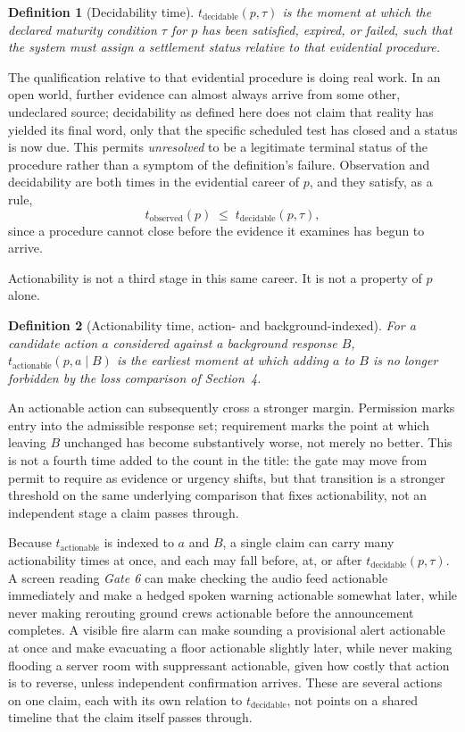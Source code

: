 \documentclass[11pt]{article}
\newtheorem{definition}{Definition}
\begin{document}
\begin{definition}[Decidability time]
$t_{\mathrm{decidable}}(p, \tau)$ is the moment at which the declared maturity condition $\tau$ for $p$ has been satisfied, expired, or failed, such that the system must assign a settlement status relative to that evidential procedure.
\end{definition}

The qualification relative to that evidential procedure is doing real work. In an open world, further evidence can almost always arrive from some other, undeclared source; decidability as defined here does not claim that reality has yielded its final word, only that the specific scheduled test has closed and a status is now due. This permits \emph{unresolved} to be a legitimate terminal status of the procedure rather than a symptom of the definition's failure. Observation and decidability are both times in the evidential career of $p$, and they satisfy, as a rule,
\[
t_{\mathrm{observed}}(p) \;\leq\; t_{\mathrm{decidable}}(p, \tau),
\]
since a procedure cannot close before the evidence it examines has begun to arrive.

Actionability is not a third stage in this same career. It is not a property of $p$ alone.

\begin{definition}[Actionability time, action- and background-indexed]
For a candidate action $a$ considered against a background response $B$, $t_{\mathrm{actionable}}(p, a \mid B)$ is the earliest moment at which adding $a$ to $B$ is no longer forbidden by the loss comparison of Section~4.
\end{definition}

An actionable action can subsequently cross a stronger margin. Permission marks entry into the admissible response set; requirement marks the point at which leaving $B$ unchanged has become substantively worse, not merely no better. This is not a fourth time added to the count in the title: the gate may move from permit to require as evidence or urgency shifts, but that transition is a stronger threshold on the same underlying comparison that fixes actionability, not an independent stage a claim passes through.

Because $t_{\mathrm{actionable}}$ is indexed to $a$ and $B$, a single claim can carry many actionability times at once, and each may fall before, at, or after $t_{\mathrm{decidable}}(p,\tau)$. A screen reading \emph{Gate 6} can make checking the audio feed actionable immediately and make a hedged spoken warning actionable somewhat later, while never making rerouting ground crews actionable before the announcement completes. A visible fire alarm can make sounding a provisional alert actionable at once and make evacuating a floor actionable slightly later, while never making flooding a server room with suppressant actionable, given how costly that action is to reverse, unless independent confirmation arrives. These are several actions on one claim, each with its own relation to $t_{\mathrm{decidable}}$, not points on a shared timeline that the claim itself passes through.
\end{document}
